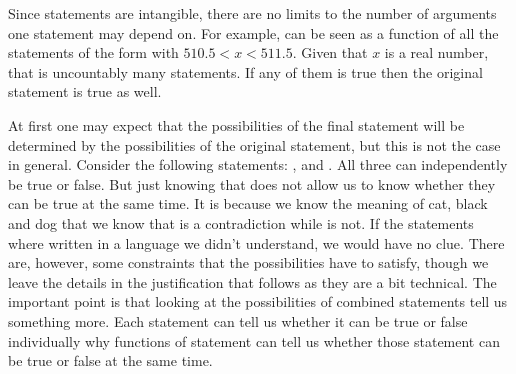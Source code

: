 \documentclass[11pt,letterpaper,fleqn]{memoir} %
\begin{document}
Since statements are intangible, there are no limits to the number of arguments one statement may depend on. For example,  can be seen as a function of all the statements of the form  with $510.5 < x < 511.5$. Given that $x$ is a real number, that is uncountably many statements. If any of them is true then the original statement is true as well.

At first one may expect that the possibilities of the final statement will be determined by the possibilities of the original statement, but this is not the case in general. Consider the following statements: ,  and . All three can independently be true or false. But just knowing that does not allow us to know whether they can be true at the same time. It is because we know the meaning of cat, black and dog that we know that  is a contradiction while  is not. If the statements where written in a language we didn't understand, we would have no clue. There are, however, some constraints that the possibilities have to satisfy, though we leave the details in the justification that follows as they are a bit technical. The important point is that looking at the possibilities of combined statements tell us something more. Each statement can tell us whether it can be true or false individually why functions of statement can tell us whether those statement can be true or false at the same time.
\end{document}
